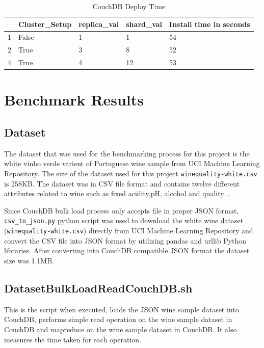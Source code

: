\begin{table}[]
\centering
\caption{CouchDB Deploy Time}
\label{t:CouchDB-DeployTime}
\begin{tabular}{|l|l|l|l|l|}
\hline
  & \textbf{Cluster\_Setup} & \textbf{replica\_val} & \textbf{shard\_val} & \textbf{Install time in seconds} \\ \hline
1 & False                   & 1                     & 1                   & 54                               \\ \hline
2 & True                    & 3                     & 8                   & 52                               \\ \hline
4 & True                    & 4                     & 12                  & 53                               \\ \hline
\end{tabular}
\end{table}

\section{Benchmark Results}
\subsection{Dataset}
The dataset that was used for the benchmarking process for this
project is the white vinho verde varient of Portuguese wine sample
from UCI Machine Learning Repository. The size of the dataset used for
this project \verb|winequality-white.csv| is 258KB. The dataset was in CSV file
format and contains twelve different attributes related to wine such
as fixed acidity,pH, alcohol and quality~\cite{www-WineQuality}. 

Since CouchDB bulk load process only accepts file in proper JSON
format, \verb|csv_to_json.py| python script was used to download the
white wine dataset (\verb|winequality-white.csv|) directly from UCI Machine
Learning Repository and convert the CSV file into JSON format by utilizing
pandas and urllib Python libraries. After converting into CouchDB
compatible JSON format the dataset size was 1.1MB.

\subsection{DatasetBulkLoadReadCouchDB.sh}
This is the script when executed, loads the JSON wine sample dataset
into CouchDB, performs simple read operation on the wine sample
dataset in CouchDB and mapreduce on the wine sample
dataset in CouchDB. It also measures the time taken for each operation.

